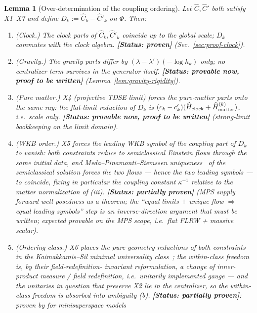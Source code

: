 \documentclass[11pt,a4paper]{article}
\newtheorem{lemma}[theorem]{Lemma}
\theoremstyle{definition}
\theoremstyle{remark}
\newcommand{\PROVEN}{\textbf{[Status: proven]}}
\newcommand{\PROVABLE}{\textbf{[Status: provable now, proof to be written]}}
\newcommand{\PARTIAL}{\textbf{[Status: partially proven]}}
\begin{document}
\begin{lemma}[Over-determination of the coupling
ordering]\label{lem:overdetermination}
Let $\widehat C,\widehat C'$ both satisfy X1--X7 and define
$D_k:=\widehat C_k-\widehat C'_k$ on $\Phi$. Then:
\begin{enumerate}[label=\textup{(\roman*)},leftmargin=*,nosep]
  \item \textup{(Clock.)} The clock parts of $\widehat
    C_k,\widehat C'_k$ coincide up to the global scale; $D_k$
    commutes with the clock algebra.
    \PROVEN{} (Sec.~\ref{sec:proof-clock}).
  \item \textup{(Gravity.)} The gravity parts differ by
    $(\lambda-\lambda')(-\log h_k)$ only; no centralizer term
    survives in the generator itself.
    \PROVABLE{} (Lemma~\ref{lem:gravity-rigidity}).
  \item \textup{(Pure matter.)} X4 (projective TDSE limit)
    forces the pure-matter parts onto the same ray:
    the flat-limit reduction of $D_k$ is
    $(c_k-c_k')(\widehat H_{\rm clock}+\widehat H_{\rm matter}
    ^{(k)})$, i.e.\ scale only. \PROVABLE{} (strong-limit
    bookkeeping on the limit domain).
  \item \textup{(WKB order.)} X5 forces the leading WKB symbol
    of the coupling part of $D_k$ to vanish: both constraints
    reduce to semiclassical Einstein flows through the
    \emph{same} initial data, and Meda--Pinamonti--Siemssen
    uniqueness~\cite{MedaPinamontiSiemssen2020} of the
    semiclassical solution forces the two flows --- hence the
    two leading symbols --- to coincide, fixing in particular
    the coupling constant $\kappa^{-1}$ relative to the matter
    normalization of (iii). \PARTIAL{} (MPS supply forward
    well-posedness as a theorem; the ``equal limits $+$ unique
    flow $\Rightarrow$ equal leading symbols'' step is an
    inverse-direction argument that must be written; expected
    provable on the MPS scope, i.e.\ flat FLRW + massive
    scalar).
  \item \textup{(Ordering class.)} X6 places the pure-geometry
    reductions of both constraints in the Kaimakkamis--Sil
    minimal universality class~\cite{KaimakkamisSil2024}; the
    within-class freedom is, by their field-redefinition-
    invariant reformulation, a change of inner-product measure
    / field redefinition, i.e.\ unitarily implemented gauge ---
    and the unitaries in question that preserve X2 lie in the
    centralizer, so the within-class freedom is \emph{absorbed
    into ambiguity (b)}. \PARTIAL{}: proven by
    \cite{KaimakkamisSil2024} for minisuperspace models

\end{enumerate}
\end{lemma}
\end{document}
